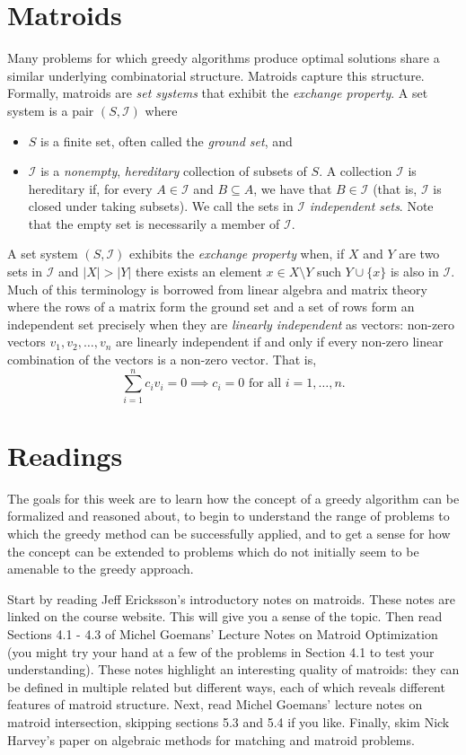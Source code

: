 \documentclass[11pt]{article}
\begin{document}
\section{Matroids} \label{sec:matroids}

Many problems for which greedy algorithms produce optimal solutions share a similar underlying combinatorial structure.  Matroids capture this structure.  Formally, matroids are {\em set systems} that exhibit the {\em exchange property}.  A set system is a pair $(S, \mathcal{I})$ where

\begin{itemize}
	\item $S$ is a finite set, often called the {\em ground set}, and
	\item $\mathcal{I}$ is a {\em nonempty}, {\em hereditary} collection of subsets of $S$.  A collection $\mathcal{I}$ is hereditary if, for every $A \in \mathcal{I}$ and $B \subseteq A$, we have that $B \in \mathcal{I}$ (that is, $\mathcal{I}$ is closed under taking subsets).  We call the sets in $\mathcal{I}$ {\em independent sets}.  Note that the empty set is necessarily a member of $\mathcal{I}$.
\end{itemize}

A set system $(S, \mathcal{I})$ exhibits the {\em exchange property} when, if $X$ and $Y$ are two sets in $\mathcal{I}$ and $|X| > |Y|$ there exists an element $x \in X \setminus Y$ such $Y \cup \{x\}$ is also in $\mathcal{I}$.  Much of this terminology is borrowed from linear algebra and matrix theory where the rows of a matrix form the ground set and a set of rows form an independent set precisely when they are {\em linearly independent} as vectors:
non-zero vectors $v_1, v_2, \ldots, v_n$ are linearly independent if and only if every non-zero linear combination of the
vectors is a non-zero vector.  That is,
\[\sum_{i=1}^n c_i v_i = 0 \implies c_i = 0 \mbox{ for all } i = 1, \ldots, n. \]

\section{Readings}
The goals for this week are to learn how the concept of a greedy algorithm can be formalized and reasoned about, to
begin to understand the range of problems to which the greedy method can be successfully applied, and to get a sense for how the concept can be extended to problems which do not initially seem to be amenable to the greedy approach.

Start by reading Jeff Ericksson's introductory notes on matroids.  These notes are linked on the course website.  This will give you a sense of the topic. Then read Sections 4.1 - 4.3 of Michel Goemans' Lecture Notes on Matroid Optimization (you might try your hand at a few of the problems in Section 4.1 to test your understanding). These notes highlight an interesting quality of matroids: they can be defined in multiple related but different ways, each of which reveals different features of matroid structure.
Next, read Michel Goemans' lecture notes on matroid intersection, skipping sections 5.3 and 5.4 if you like.  Finally, skim Nick Harvey's paper on algebraic methods for matching and matroid problems.
\end{document}
